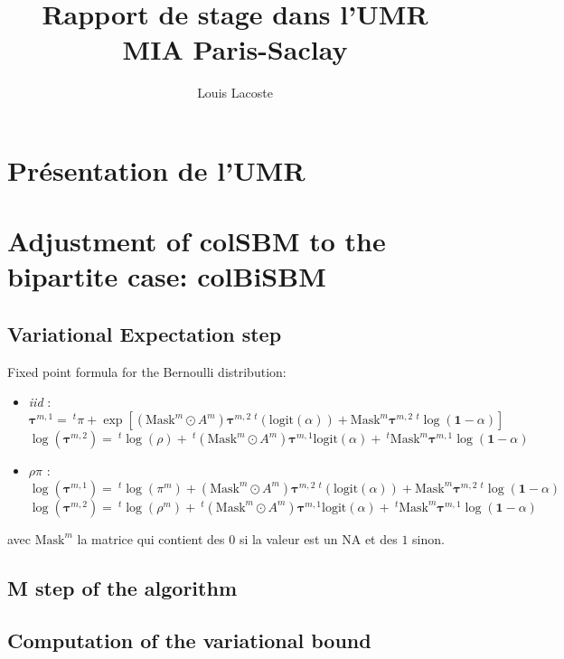 \documentclass[12pt,a4paper]{report}
\title{Rapport de stage dans l'UMR MIA Paris-Saclay}
\author{Louis Lacoste}
\begin{document}
\maketitle
\tableofcontents

\chapter{Présentation de l'UMR}

\chapter{Adjustment of colSBM to the bipartite case: colBiSBM}

\section{Variational Expectation step}
Fixed point formula for the Bernoulli distribution:
\begin{itemize}
    \item \textit{iid} :
    \[ \bm{\tau}^{m,1} = ~^{t}\pi + \exp[(\text{Mask}^{m} \odot A^{m})
        \bm{\tau}^{m,2} ~^{t}(\text{logit}(\alpha)) + \text{Mask}^{m} 
        \bm{\tau}^{m,2} ~^{t}\log(\bm{1} - \alpha)] \]
    \[ \log(\bm{\tau}^{m,2}) = ~^{t}\log(\rho) + ~^{t}(\text{Mask}^{m} \odot A^{m}) 
    \bm{\tau}^{m,1} \text{logit}(\alpha) + ~^{t}\text{Mask}^{m} 
        \bm{\tau}^{m,1} \log(\bm{1} - \alpha) \]
    \item $\rho\pi$ :
        \[ \log(\bm{\tau}^{m,1}) = ~^{t}\log(\pi^{m}) + (\text{Mask}^{m} \odot A^{m})
            \bm{\tau}^{m,2} ~^{t}(\text{logit}(\alpha)) + \text{Mask}^{m} 
            \bm{\tau}^{m,2} ~^{t}\log(\bm{1} - \alpha) \]
        \[ \log(\bm{\tau}^{m,2}) = ~^{t}\log(\rho^{m}) + ~^{t}(\text{Mask}^{m} \odot A^{m}) 
        \bm{\tau}^{m,1} \text{logit}(\alpha) + ~^{t}\text{Mask}^{m} 
            \bm{\tau}^{m,1} \log(\bm{1} - \alpha) \]
\end{itemize}

avec $\text{Mask}^{m}$ la matrice qui contient des $0$ si la valeur est un NA et
des $1$ sinon.

\section{M step of the algorithm}

\section{Computation of the variational bound}
\end{document}
